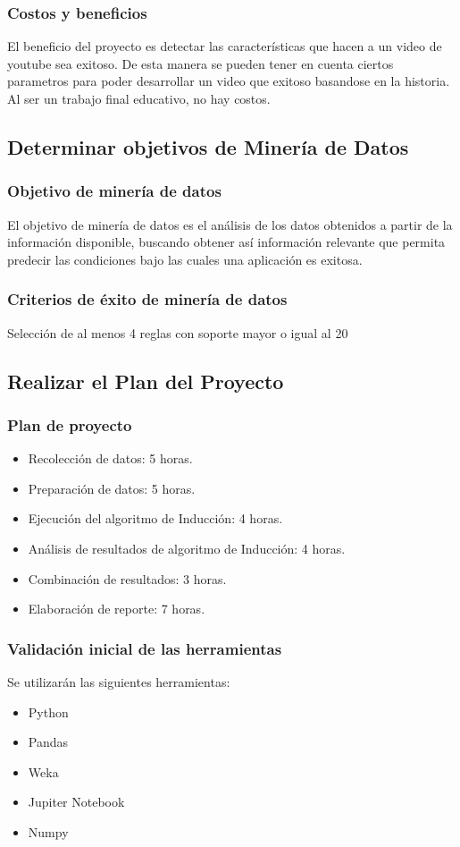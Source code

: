     \subsubsection{Costos y beneficios}
        El beneficio del proyecto es detectar las características que hacen a
        un video de youtube sea exitoso. De esta manera se pueden tener en
        cuenta ciertos parametros para poder desarrollar un video que exitoso
        basandose en la historia.
        Al ser un trabajo final educativo, no hay costos.
\subsection{Determinar objetivos de Minería de Datos}
    \subsubsection{Objetivo de minería de datos}
    El objetivo de minería de datos es el análisis de los datos obtenidos a
    partir de la información disponible, buscando obtener así información
    relevante que permita predecir las condiciones bajo las cuales una
    aplicación es exitosa.
    \subsubsection{Criterios de éxito de minería de datos}
    Selección de al menos 4 reglas con soporte mayor o igual al 20%
\subsection{Realizar el Plan del Proyecto}
    \subsubsection{Plan de proyecto}
        \begin{itemize}
            \item Recolección de datos: 5 horas.
            \item Preparación de datos: 5 horas.
            \item Ejecución del algoritmo de Inducción: 4 horas.
            \item Análisis de resultados de algoritmo de Inducción: 4 horas.
            \item Combinación de resultados: 3 horas.
            \item Elaboración de reporte: 7 horas.
        \end{itemize}
    \subsubsection{Validación inicial de las herramientas}
        Se utilizarán las siguientes herramientas:
        \begin{itemize}
            \item Python
            \item Pandas
            \item Weka
            \item Jupiter Notebook
            \item Numpy
        \end{itemize}